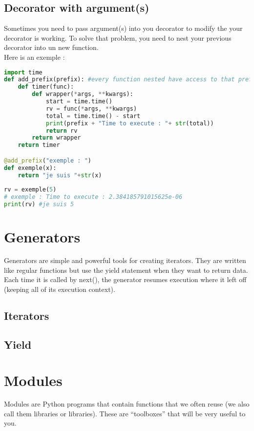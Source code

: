 \documentclass[a4paper, 12pt, titlepage]{scrartcl} %
\begin{document}
\subsection{Decorator with argument(s)}
Sometimes you need to pass argument(s) into you decorator to modify the your decorator is working. To solve that problem, you need to nest your previous decorator into un new function. \\
Here is an exemple : \\
\begin{lstlisting}[language=Python]
import time
def add_prefix(prefix): #every function nested have access to that prefix : enclosing
    def timer(func):
    	def wrapper(*args, **kwargs):
    		start = time.time()
    		rv = func(*args, **kwargs)
    		total = time.time() - start
    		print(prefix + "Time to execute : "+ str(total))
    		return rv
    	return wrapper
    return timer

@add_prefix("exemple : ")
def exemple(x):
	return "je suis "+str(x)
	
rv = exemple(5)
# exemple : Time to execute : 2.384185791015625e-06
print(rv) #je suis 5
\end{lstlisting} \vspace{5mm}

\newpage
\section{Generators}
\label{sec:Generators}
Generators are simple and powerful tools for creating iterators. They are written like regular functions but use the yield statement when they want to return data. Each time it is called by next(), the generator resumes execution where it left off (keeping all of its execution context).\newline
\subsection{Iterators}
\subsection{Yield}

\newpage
\section{Modules}
Modules are Python programs that contain functions that we often reuse (we also call them libraries or libraries). These are “toolboxes” that will be very useful to you.\newline
\end{document}
